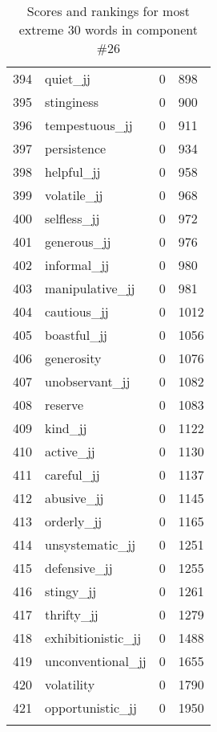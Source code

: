 \begin{longtable}[!htbp]{| rlr@{.}l |}
    394 & quiet\_jj & 0 & 898 \\
    395 & stinginess & 0 & 900 \\
    396 & tempestuous\_jj & 0 & 911 \\
    397 & persistence & 0 & 934 \\
    398 & helpful\_jj & 0 & 958 \\
    399 & volatile\_jj & 0 & 968 \\
    400 & selfless\_jj & 0 & 972 \\
    401 & generous\_jj & 0 & 976 \\
    402 & informal\_jj & 0 & 980 \\
    403 & manipulative\_jj & 0 & 981 \\
    404 & cautious\_jj & 0 & 1012 \\
    405 & boastful\_jj & 0 & 1056 \\
    406 & generosity & 0 & 1076 \\
    407 & unobservant\_jj & 0 & 1082 \\
    408 & reserve & 0 & 1083 \\
    409 & kind\_jj & 0 & 1122 \\
    410 & active\_jj & 0 & 1130 \\
    411 & careful\_jj & 0 & 1137 \\
    412 & abusive\_jj & 0 & 1145 \\
    413 & orderly\_jj & 0 & 1165 \\
    414 & unsystematic\_jj & 0 & 1251 \\
    415 & defensive\_jj & 0 & 1255 \\
    416 & stingy\_jj & 0 & 1261 \\
    417 & thrifty\_jj & 0 & 1279 \\
    418 & exhibitionistic\_jj & 0 & 1488 \\
    419 & unconventional\_jj & 0 & 1655 \\
    420 & volatility & 0 & 1790 \\
    421 & opportunistic\_jj & 0 & 1950 \\
    \hline
    \caption{Scores and rankings for most extreme 30 words in component \#26} \\
\end{longtable}
